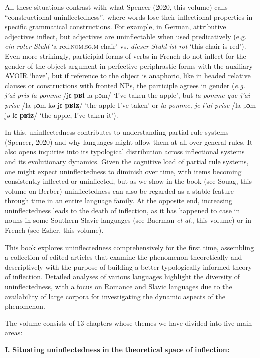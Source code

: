 \documentclass[output=paper]{langscibook}
\begin{document}
  All these situations contrast with what Spencer (2020, this volume) calls “constructional uninflectedness”, where words lose their inflectional properties in specific grammatical constructions. For example, in German, attributive adjectives inflect, but adjectives are uninflectable when used predicatively (e.g. \textit{ein roter Stuhl} ‘a red.\textsc{nom.sg.m} chair’ vs. \textit{dieser Stuhl ist rot} ‘this chair is red’). Even more strikingly, participial forms of verbs in French do not inflect for the gender of the object argument in perfective periphrastic forms with the auxiliary AVOIR ‘have’, but if reference to the object is anaphoric, like in headed relative clauses or constructions with fronted NPs, the participle agrees in gender (\textit{e.g. j’ai pris la pomme} /jɛ \textbf{pʁi} la pɔm/ ‘I’ve taken the apple’, but \textit{la pomme que j’ai prise} /la pɔm kə jɛ \textbf{pʁiz}/ ‘the apple I’ve taken’ or \textit{la pomme, je l’ai prise} /la pɔm jə lɛ \textbf{pʁiz}/ ‘the apple, I’ve taken it’). 

  In this, uninflectedness contributes to understanding partial rule systems (Spencer, 2020) and why languages might allow them at all over general rules. It also opens inquiries into its typological distribution across inflectional systems and its evolutionary dynamics. Given the cognitive load of partial rule systems, one might expect uninflectedness to diminish over time, with items becoming consistently inflected or uninflected, but as we show in the book (see Souag, this volume on Berber) uninflectedness can also be regarded as a stable feature through time in an entire language family. At the opposite end, increasing uninflectedness leads to the death of inflection, as it has happened to case in nouns in some Southern Slavic languages (see Baerman \textit{et al}., this volume) or in French (see Esher, this volume).

  This book explores uninflectedness comprehensively for the first time, assembling a collection of edited articles that examine the phenomenon theoretically and descriptively with the purpose of building a better typologically-informed theory of inflection. Detailed analyses of various languages highlight the diversity of uninflectedness, with a focus on Romance and Slavic languages due to the availability of large corpora for investigating the dynamic aspects of the phenomenon. 

  The volume consists of 13 chapters whose themes we have divided into five main areas: 

\textbf{I.} \textbf{Situating} \textbf{uninflectedness} \textbf{in} \textbf{the} \textbf{theoretical} \textbf{space} \textbf{of} \textbf{inflection:} 
\end{document}
